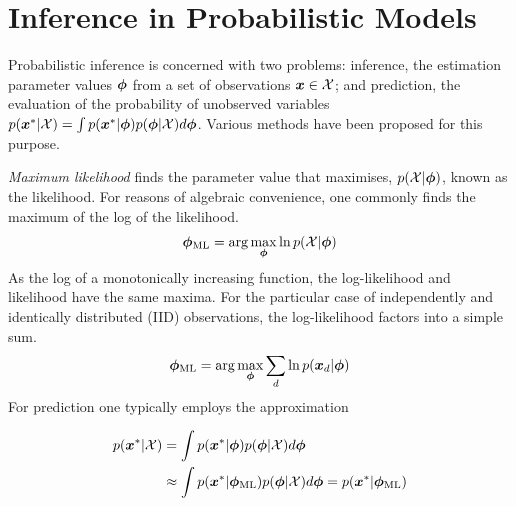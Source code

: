 

\newcommand \zd   { { \vv{z}_d } }
\newcommand \qfam { { \mathcal{Q} } }
\newcommand \xdat { { \mathcal{X} } }
\newcommand \zdat { { \mathcal{Z} } }
\newcommand \xnew { { \vv{x}^{*} } }
\newcommand \znew { { \vv{z}^{*} } }
\newcommand \param { { \vv{\phi} } }
\newcommand \params { { \Phi } }
\newcommand \ml[1] { { {#1}_{\text{ML}} } } 
\newcommand \map[1] { { {#1}_{\text{MAP}} } } 
\newcommand \quarter { { \oneover{4} } }
\newcommand \eighth { { \oneover{8} } }
\newcommand \fqt[1] { { \mathcal{F}\left( {#1} \right) } }
\newcommand \joint { { p(\xdat, \zdat | \params) } }
\newcommand \logjoint { { \ln \joint } }
\newcommand \exlogjoint[1] { { \ex{\logjoint}{{#1}} } }

\section{Inference in Probabilistic Models}
Probabilistic inference is concerned with two problems: inference, the estimation parameter values $\param$ from a set of observations $\vv{x} \in \xdat$; and prediction, the evaluation of the probability of unobserved variables $p(\xnew | \xdat) = \int p(\xnew | \param) p(\param | \xdat) d\param$. Various methods have been proposed for this purpose.

\emph{Maximum likelihood} finds the parameter value that maximises, $p(\xdat|\param)$, known as the likelihood. For reasons of algebraic convenience, one commonly finds the maximum of the log of the likelihood.\begin{align}
\ml{\param} = \arg \max_{\param} \ln p(\xdat | \param)
\end{align}
As the log of a monotonically increasing function, the log-likelihood and likelihood have the same maxima. For the particular case of independently and identically distributed (IID) observations, the log-likelihood factors into a simple sum.
\begin{align}
\ml{\param} = \arg \max_{\param} \sum_d \ln p(\xd | \param)
\end{align}
For prediction one typically employs the approximation

\begin{align}
p(\xnew | \xdat) 
&= \int p(\xnew | \param) p(\param | \xdat) d\param \label{eqn:ml-prediction}\\
&\approx \int p(\xnew | \ml{\param}) p(\param | \xdat) d\param
=  p(\xnew | \ml{\param})
\end{align}

